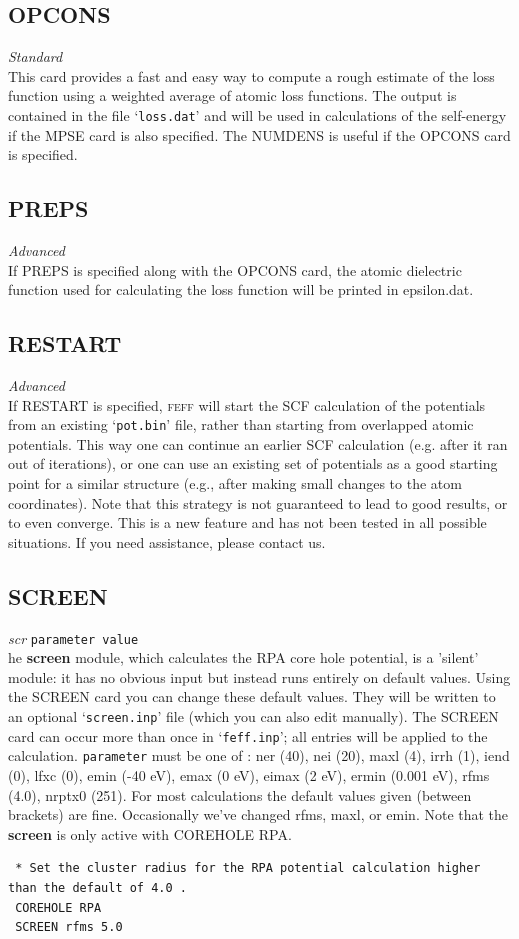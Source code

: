 \documentclass[11pt,oneside]{report} %
\renewcommand{\htmlref}[2]{\hyperlink{#2}{#1}}
\newcommand{\program}[1]{\textsc{#1}}
\newcommand{\feff}{\program{feff}}
\newenvironment{Card}[4]%
      {\vspace{3ex}%
        \subsection{#1}
        \quad\textsl{#3}\newline
        \quad\texttt{#2}\newline%
        \label{card:#4}\\}
      {}
\newcommand{\file}[1]{`\texttt{#1}'}
\newcommand{\module}[1]{\textrm{\bf{#1}}}
\renewcommand{\htmlref}[2]{{#1}} %
\begin{document}
\begin{Card}{OPCONS}{}{Standard}{opc}
  This card provides a fast and easy way to compute a rough estimate of the
  loss function using a weighted average of atomic loss functions. The
  output is contained in the file \file{loss.dat} 
  and will be used in calculations of the self-energy if the
  \htmlref{MPSE}{card:mps} card is also specified. The
  \htmlref{NUMDENS}{card:num} is useful if the OPCONS card is
  specified. 
\end{Card}



\begin{Card}{PREPS}{}{Advanced}{pre}
  If PREPS is specified along with the  \htmlref{OPCONS}{card:mps}
  card, the atomic dielectric function used for calculating the loss
  function will be printed in epsilon.dat. 
\end{Card}


\begin{Card}{RESTART}{}{Advanced}{res}
  If RESTART is specified, {\feff} will start the SCF calculation of the potentials from an existing \file{pot.bin} file, rather than starting from
  overlapped atomic potentials.  This way one can continue an earlier SCF calculation (e.g. after it ran out of iterations), or one can use an existing
  set of potentials as a good starting point for a similar structure (e.g., after making small changes to the atom coordinates).  Note that this strategy is not
  guaranteed to lead to good results, or to even converge.  This is a new feature and has not been tested in all possible situations.  If you need assistance,
  please contact us. 
\end{Card}


\begin{Card}{SCREEN}{parameter value}{scr}
 The \module{screen} module, which calculates the RPA core hole potential, is a 'silent' module: it has no obvious input but instead runs entirely on 
 default values.  Using the SCREEN card you can change these default values.  They will be written to an optional \file{screen.inp} file (which you can also
 edit manually).  The SCREEN card can occur more than once in \file{feff.inp}; all entries will be applied to the calculation.
 \texttt{parameter} must be one of : ner (40), nei (20), maxl (4), irrh (1), iend (0), lfxc (0), emin (-40 eV), emax (0 eV), eimax (2 eV), ermin (0.001 eV), rfms (4.0), nrptx0 (251).  For most calculations the default values given (between brackets) are fine.  Occasionally we've changed rfms, maxl, or emin.  Note that the \module{screen} is only active with COREHOLE RPA.
 \begin{verbatim}
 * Set the cluster radius for the RPA potential calculation higher than the default of 4.0 .
 COREHOLE RPA
 SCREEN rfms 5.0
 \end{verbatim}
\end{Card}
\end{document}
